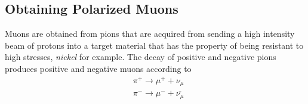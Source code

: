 \documentclass{outhesis}
\begin{document}
\subsection{Obtaining Polarized Muons}

Muons are obtained from pions that are acquired from sending a high intensity beam of protons into a target material that has the property of being resistant to high stresses, \emph{nickel} for example. The decay of positive and negative pions produces positive and negative muons according to 
\begin{equation}
\begin{split}
&\pi^+ \rightarrow \mu^+ + \nu_{\mu}\\
&\pi^- \rightarrow \mu^- + \bar{\nu_{\mu}}
\end{split}
\end{equation}
\end{document}
